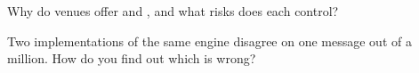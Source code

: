 \begin{interviewq}\label{iq:mx:build-a-matching-engine-and-exchange-simulator:5}
Why do venues offer  and , and what risks does each control?
\end{interviewq}

\begin{interviewq}\label{iq:mx:build-a-matching-engine-and-exchange-simulator:6}
Two implementations of the same engine disagree on one message out of a million. How do you find out which is wrong?
\end{interviewq}
